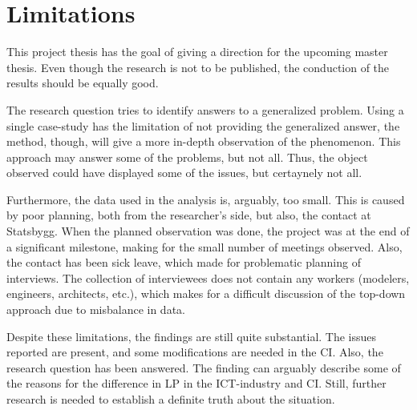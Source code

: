 \section{Limitations}
This project thesis has the goal of giving a direction for the upcoming master thesis. Even though the research is not to be published, the conduction of the results should be equally good. 

The research question tries to identify answers to a generalized problem. Using a single case-study has the limitation of not providing the generalized answer, the method, though, will give a more in-depth observation of the phenomenon. This approach may answer some of the problems, but not all. Thus, the object observed could have displayed some of the issues, but certaynely not all.

Furthermore, the data used in the analysis is, arguably, too small. This is caused by poor planning, both from the researcher's side, but also, the contact at Statsbygg. When the planned observation was done, the project was at the end of a significant milestone, making for the small number of meetings observed. Also, the contact has been sick leave, which made for problematic planning of interviews. The collection of interviewees does not contain any workers (modelers, engineers, architects, etc.), which makes for a difficult discussion of the top-down approach due to misbalance in data.

Despite these limitations, the findings are still quite substantial. The issues reported are present, and some modifications are needed in the CI. Also, the research question has been answered. The finding can arguably describe some of the reasons for the difference in LP in the ICT-industry and CI. Still, further research is needed to establish a definite truth about the situation.

\cleardoublepage